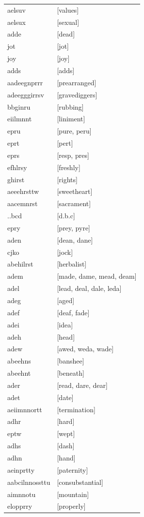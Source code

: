 \documentclass{article}
\begin{document}
\begin{tabular}{ll}
aelsuv & [values] \\
aelsux & [sexual] \\
adde & [dead] \\
jot & [jot] \\
joy & [joy] \\
adds & [adds] \\
aadeegnprrr & [prearranged] \\
adeegggirrsv & [gravediggers] \\
bbginru & [rubbing] \\
eiilmnnt & [liniment] \\
epru & [pure, peru] \\
eprt & [pert] \\
eprs & [resp, pres] \\
efhlrsy & [freshly] \\
ghirst & [rights] \\
aeeehrsttw & [sweetheart] \\
aacemnrst & [sacrament] \\
..bcd & [d.b.c] \\
epry & [prey, pyre] \\
aden & [dean, dane] \\
cjko & [jock] \\
abehilrst & [herbalist] \\
adem & [made, dame, mead, deam] \\
adel & [lead, deal, dale, leda] \\
adeg & [aged] \\
adef & [deaf, fade] \\
adei & [idea] \\
adeh & [head] \\
adew & [awed, weda, wade] \\
abeehns & [banshee] \\
abeehnt & [beneath] \\
ader & [read, dare, dear] \\
adet & [date] \\
aeiimnnortt & [termination] \\
adhr & [hard] \\
eptw & [wept] \\
adhs & [dash] \\
adhn & [hand] \\
aeinprtty & [paternity] \\
aabcilnnossttu & [consubstantial] \\
aimnnotu & [mountain] \\
elopprry & [properly] \\

\end{tabular}
\end{document}
